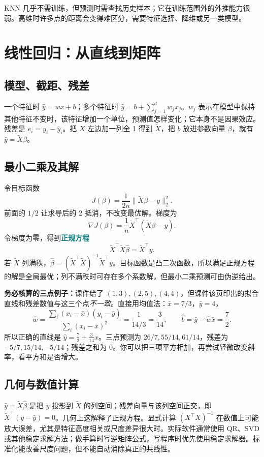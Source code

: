 \documentclass[UTF8,11pt,oneside]{ctexbook}
\newcommand{\key}[1]{\textcolor{teal}{\bfseries #1}}
\begin{document}
KNN 几乎不需训练，但预测时需查找历史样本；它在训练范围外的外推能力很弱。高维时许多点的距离会变得难区分，需要特征选择、降维或另一类模型。

\chapter{线性回归：从直线到矩阵}
\section{模型、截距、残差}
一个特征时 $\hat y=wx+b$；多个特征时 $\hat y=b+\sum_{j=1}^{d}w_jx_j$。$w_j$ 表示在模型中保持其他特征不变时，该特征增加一个单位，预测值怎样变化；它本身不是因果效应。残差是 $e_i=y_i-\hat y_i$。把 $X$ 左边加一列全 1 得到 $\widetilde X$，把 $b$ 放进参数向量 $\beta$，就有 $\hat y=\widetilde X\beta$。

\section{最小二乘及其解}
令目标函数
\[
J(\beta)=\frac{1}{2n}\|\widetilde X\beta-y\|_2^2.
\]
前面的 $1/2$ 让求导后的 $2$ 抵消，不改变最优解。梯度为
\[
\nabla J(\beta)=\frac1n\widetilde X^\top(\widetilde X\beta-y).
\]
令梯度为零，得到\key{正规方程}
\[
\widetilde X^\top\widetilde X\hat\beta=\widetilde X^\top y.
\]
若 $\widetilde X$ 列满秩，$\hat\beta=(\widetilde X^\top\widetilde X)^{-1}\widetilde X^\top y$。目标函数是凸二次函数，所以满足正规方程的解是全局最优；列不满秩时可存在多个系数解，但最小二乘预测可由伪逆给出。

\textbf{务必核算的三点例子：}课件给了 $(1,3),(2,5),(4,4)$，但课件该页印出的拟合直线和残差数值与这三个点\emph{不一致}。直接用均值法：$\bar x=7/3$，$\bar y=4$，
\[
\hat w=\frac{\sum_i(x_i-\bar x)(y_i-\bar y)}{\sum_i(x_i-\bar x)^2}=\frac{1}{14/3}=\frac3{14},\qquad
\hat b=\bar y-\hat w\bar x=\frac72.
\]
所以正确的直线是 $\hat y=\frac72+\frac3{14}x$。三点预测为 $26/7,55/14,61/14$，残差为 $-5/7,15/14,-5/14$；残差之和为 $0$。你可以把三项平方相加，再尝试轻微改变斜率，看平方和是否增大。

\section{几何与数值计算}
$\hat y=\widetilde X\hat\beta$ 是把 $y$ 投影到 $\widetilde X$ 的列空间；残差向量与该列空间正交，即 $\widetilde X^\top(y-\hat y)=0$。几何上这解释了正规方程。显式计算 $(X^\top X)^{-1}$ 在数值上可能放大误差，尤其是特征高度相关或尺度差异很大时。实际软件通常使用 QR、SVD 或其他稳定求解方法；做手算时写逆矩阵公式，写程序时优先使用稳定求解器。标准化能改善尺度问题，但不能自动消除真正的共线性。
\end{document}
